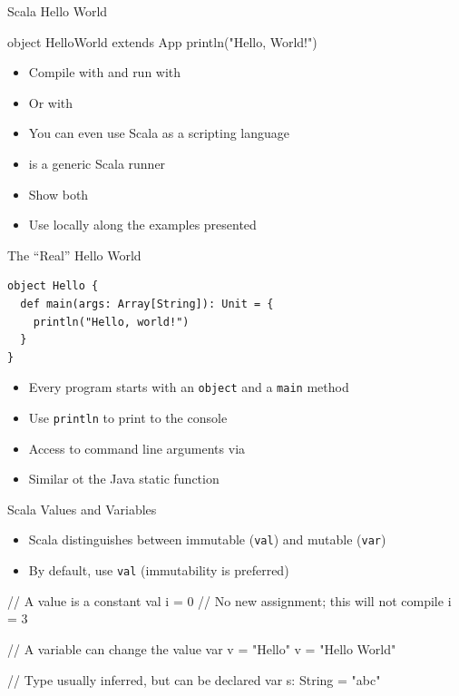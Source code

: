 \begin{frame}[fragile]{Scala Hello World}
\begin{chisel}
object HelloWorld extends App {
  println("Hello, World!")
}
\end{chisel}
\begin{itemize}
\item Compile with  and run with 
\item Or with 
\item You can even use Scala as a scripting language
\item {} is a generic Scala runner
\item Show both
\item Use  locally along the examples presented
\end{itemize}
\end{frame}

\begin{frame}[fragile]{The ``Real'' Hello World}

\begin{verbatim}
object Hello {
  def main(args: Array[String]): Unit = {
    println("Hello, world!")
  }
}
\end{verbatim}

\begin{itemize}
    \item Every program starts with an \texttt{object} and a \texttt{main} method
    \item Use \texttt{println} to print to the console
    \item Access to command line arguments via 
    \item Similar ot the Java static  function
\end{itemize}
\end{frame}

\begin{frame}[fragile]{Scala Values and Variables}
\begin{itemize}
    \item Scala distinguishes between immutable (\texttt{val}) and mutable (\texttt{var})
    \item By default, use \texttt{val} (immutability is preferred)
\end{itemize}
\begin{chisel}
// A value is a constant
val i = 0
// No new assignment; this will not compile
i = 3

// A variable can change the value
var v = "Hello"
v = "Hello World"

// Type usually inferred, but can be declared
var s: String = "abc"
\end{chisel}
\end{frame}

